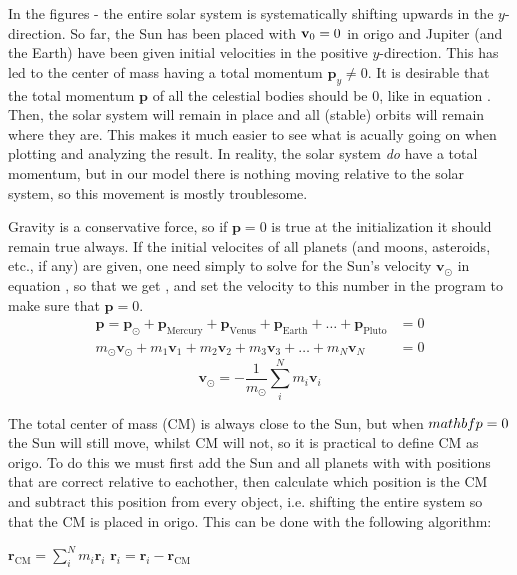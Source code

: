 In the figures - the entire solar system is systematically shifting upwards in the $y$-direction. So far, the Sun has been placed with $\mathbf{v}_0 = 0$ in origo and Jupiter (and the Earth) have been given initial velocities in the positive $y$-direction. This has led to the center of mass having a total momentum $\mathbf{p}_y \neq 0$. It is desirable that the total momentum $\mathbf{p}$ of all the celestial bodies should be $0$, like in equation . Then, the solar system will remain in place and all (stable) orbits will remain where they are. This makes it much easier to see what is acually going on when plotting and analyzing the result. In reality, the solar system \emph{do} have a total momentum, but in our model there is nothing moving relative to the solar system, so this movement is mostly troublesome.

Gravity is a conservative force, so if $\mathbf{p} = 0$ is true at the initialization it should remain true always. If the initial velocites of all planets (and moons, asteroids, etc., if any) are given, one need simply to solve for the Sun's velocity $\mathbf{v}_\odot$ in equation , so that we get , and set the velocity to this number in the program to make sure that $\mathbf{p} = 0$.
\begin{align}
	\label{eq:momentum_sum}
	\mathbf{p} =
	\mathbf{p}_\odot
	+ \mathbf{p}_\textrm{Mercury}
	+ \mathbf{p}_\textrm{Venus}
	+ \mathbf{p}_\textrm{Earth}
	+ \dots
	+ \mathbf{p}_\textrm{Pluto}
	&= 0 \\
	\label{eq:momentum_sun}
	m_\odot \mathbf{v}_\odot
	+ m_1 \mathbf{v}_1
	+ m_2 \mathbf{v}_2
	+ m_3 \mathbf{v}_3
	+ \dots
	+ m_N \mathbf{v}_N
	&= 0
\end{align}
\begin{equation}
    \label{eq:momentum_sum2}
    \mathbf{v}_\odot = - \frac{1}{m_\odot} \sum_i^N m_i \mathbf{v}_i
\end{equation}

The total center of mass (CM) is always close to the Sun, but when $\\mathbf{p} = 0$ the Sun will still move, whilst CM will not, so it is practical to define CM as origo. To do this we must first add the Sun and all planets with with positions that are correct relative to eachother, then calculate which position is the CM and subtract this position from every object, i.e. shifting the entire system so that the CM is placed in origo. This can be done with the following algorithm:
\begin{algorithmic}
    \State $ \mathbf{r}_{\textrm{CM}} = \sum_i^N m_i \mathbf{r}_i $
        \State $ \mathbf{r}_i = \mathbf{r}_i - \mathbf{r}_{\textrm{CM}} $
    \EndFor
\end{algorithmic}

